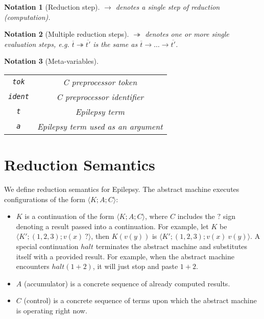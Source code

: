 \documentclass[12pt]{article}
\theoremstyle{break}
\newtheorem{notation}{Notation}
\begin{document}
\begin{notation}[Reduction step]
    $\to$ denotes a single step of reduction (computation).
\end{notation}

\begin{notation}[Multiple reduction steps]
    $\twoheadrightarrow$ denotes one or more single evaluation steps, e.g.
    $\overline{t} \twoheadrightarrow \overline{t'}$ is the same as
    $\overline{t} \to \ldots \to \overline{t'}$.
\end{notation}

\begin{notation}[Meta-variables]
    \ \\
    \begin{tabular}{|c|c|}
        \hline
        \texttt{tok} & C preprocessor token \\
        \texttt{ident} & C preprocessor identifier \\
        \texttt{t} & Epilepsy term \\
        \texttt{a} & Epilepsy term used as an argument \\
        \hline
    \end{tabular}
\end{notation}

\section{Reduction Semantics}

We define reduction semantics for Epilepsy. The abstract machine executes configurations
of the form $\langle K; A; C \rangle$:

\begin{itemize}
    \item $K$ is a continuation of the form $\langle K; A; C \rangle$, where
    $C$ includes the $?$ sign denoting a result passed into a continuation.
    For example, let $K$ be $\langle K'; (1, 2, 3); v(x) \ ? \rangle$,
    then $K(v(y))$ is $\langle K'; (1, 2, 3); v(x) \ v(y) \rangle$. A special
    continuation $halt$ terminates the abstract machine and substitutes itself
    with a provided result. For example, when the abstract machine encounters
    $halt(1 + 2)$, it will just stop and paste $1 + 2$.

    \item $A$ (accumulator) is a concrete sequence of already computed results.

    \item $C$ (control) is a concrete sequence of terms upon which the abstract
    machine is operating right now.
\end{itemize}
\end{document}
